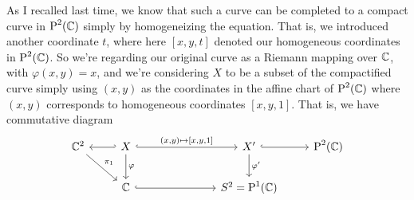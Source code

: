 \documentclass{article}
\begin{document}
As I recalled last time, we know that such a curve can be completed to a compact curve in \(\operatorname{P}^{2}({\mathbb{C}})\) simply by homogeneizing the equation. That is, we introduced another coordinate \(t\), where here \([x, y, t]\) denoted our homogeneous coordinates in \(\operatorname{P}^{2}({\mathbb{C}})\). So we're regarding our original curve as a Riemann mapping over \(\mathbb{C}\), with \(\varphi(x, y) = x\), and we're considering \(X\) to be a subset of the compactified curve simply using \((x, y)\) as the coordinates in the affine chart of \(\operatorname{P}^{2}({\mathbb{C}})\) where \((x, y)\) corresponds to homogeneous coordinates \([x, y, 1]\). That is, we have commutative diagram
\begin{equation}
\begin{tikzcd}
  \mbb{C}^2 \arrow[hookleftarrow, r] \arrow[rd, "\pi_1"]
    & X \arrow[hookrightarrow, rrr, "{(x, y) \mapsto [x, y, 1]}"] \arrow[d, "\varphi"]
    &&& X' \arrow[hookrightarrow, r] \arrow[d, "\varphi'"]
    & \CP{2}
    \\
  & \mbb{C} \arrow[hookrightarrow, rrr] &&& S^2 = \CP{1}
\end{tikzcd}
\end{equation}
\end{document}
